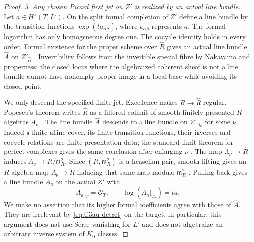 \begin{proof}
\emph{3. Any chosen Picard first jet on $Z'$ is realized by an actual line bundle.}
Let $a\in H^1(T,L')$. On the split formal completion of $Z'$
define a line bundle by the transition functions
$\exp(t a_{\alpha\beta})$, where $a_{\alpha\beta}$ represents
$a$. The formal logarithm has only homogeneous degree one.
The cocycle identity holds in every order. Formal existence for
the proper scheme over $\widehat R$ gives an actual line bundle
$\widehat A$ on $Z'_{\widehat R}$
\citep[Theorem 30.27.1, Tag 088E]{rootStacksExistence}.
Invertibility follows from the invertible special fibre by
Nakayama and properness: the closed locus where the algebraized
coherent sheaf is not a line bundle cannot have nonempty proper
image in a local base while avoiding its closed point.

We only descend the specified finite jet. Excellence makes
$R\to\widehat R$ regular. Popescu's theorem writes $\widehat R$
as a filtered colimit of smooth finitely presented $R$-algebras
$A_\nu$ \citep[Theorem 16.12.1, Tag 07GC]{cyStacksPicardJet}.
The line bundle $\widehat A$ descends to a line bundle on
$Z'_{A_\nu}$ for some $\nu$. Indeed a finite affine cover, its
finite transition functions, their inverses and cocycle relations
are finite presentation data; the standard limit theorem for
perfect complexes gives the same conclusion after enlarging
$\nu$ \citep[Lemma 36.29.3, Tag 09RF]{cyStacksPicardJet}.
The map $A_\nu\to\widehat R$ induces $A_\nu\to R/\mathfrak m_R^2$.
Since $(R,\mathfrak m_R^2)$ is a henselian pair, smooth lifting
gives an $R$-algebra map $A_\nu\to R$ inducing that same map
modulo $\mathfrak m_R^2$
\citep[Lemma 15.13.3, Tag 0H74]{cyStacksPicardJet}.
Pulling back gives a line bundle $A_a$ on the actual $Z'$ with
\begin{equation}\label{eq:C3au-jet}
          A_a|_T=\mathcal O_T,
          \qquad \log(A_a|_{T_2})=t a.
\end{equation}
We make no assertion that its higher formal coefficients agree
with those of $\widehat A$. They are irrelevant by
\eqref{eq:C3au-detect} on the target. In particular, this argument
does not use Serre vanishing for $L'$ and does not algebraize
an arbitrary inverse system of $K_0$ classes.


\end{proof}

